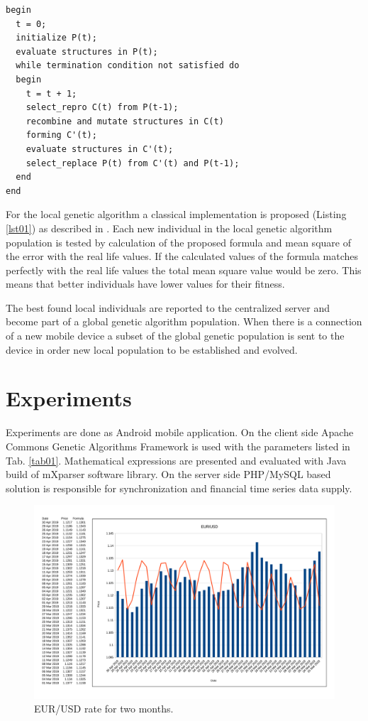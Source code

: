 \documentclass[graybox]{svmult}
\begin{document}
\begin{lstlisting}[caption={Genetic algorithm pseudo-code.},label={lst01},backgroundcolor=\color{very-light-gray},frame={single}]
begin
  t = 0;
  initialize P(t);
  evaluate structures in P(t);
  while termination condition not satisfied do
  begin
    t = t + 1;
    select_repro C(t) from P(t-1);
    recombine and mutate structures in C(t)
    forming C'(t);
    evaluate structures in C'(t);
    select_replace P(t) from C'(t) and P(t-1);
  end
end
\end{lstlisting}
\FloatBarrier

For the local genetic algorithm a classical implementation is proposed (Listing \ref{lst01}) as described in \cite{baeck01}. Each new individual in the local genetic algorithm population is tested by calculation of the proposed formula and mean square of the error with the real life values. If the calculated values of the formula matches perfectly with the real life values the total mean square value would be zero. This means that better individuals have lower values for their fitness.

The best found local individuals are reported to the centralized server and become part of a global genetic algorithm population. When there is a connection of a new mobile device a subset of the global genetic population is sent to the device in order new local population to be established and evolved.

\section{Experiments} \label{Experiments}

Experiments are done as Android mobile application. On the client side Apache Commons Genetic Algorithms Framework \cite{apache01} is used with the parameters listed in Tab. \ref{tab01}. Mathematical expressions are presented and evaluated with Java build of mXparser \cite{gromada01} software library. On the server side PHP/MySQL based solution \cite{balabanov03} is responsible for synchronization and financial time series data supply. 

\begin{figure}[b]
\sidecaption
\includegraphics[scale=0.15]{fig01.png}
\caption{EUR/USD rate for two months.}
\label{fig01}
\end{figure}
\FloatBarrier
\end{document}
